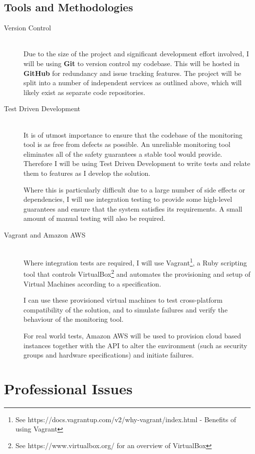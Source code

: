 \documentclass{cshonours}
\begin{document}
\section{Tools and Methodologies}
\begin{description}
  \item [Version Control]\hfill \\
    Due to the size of the project and significant development effort involved, I will be using \textbf{Git} to version control my codebase. This will be hosted in \textbf{GitHub} for redundancy and issue tracking features. The project will be split into a number of independent services as outlined above, which will likely exist as separate code repositories.
  \item [Test Driven Development]\hfill \\
    It is of utmost importance to ensure that the codebase of the monitoring tool is as free from defects as possible. An unreliable monitoring tool eliminates all of the safety guarantees a stable tool would provide. Therefore I will be using Test Driven Development to write tests and relate them to features as I develop the solution.

    Where this is particularly difficult due to a large number of side effects or dependencies, I will use integration testing to provide some high-level guarantees and ensure that the system satisfies its requirements. A small amount of manual testing will also be required.
  \item [Vagrant and Amazon AWS]\hfill \\
    Where integration tests are required, I will use Vagrant\footnote{See
    https://docs.vagrantup.com/v2/why-vagrant/index.html - Benefits of using Vagrant}, a Ruby scripting tool that controls
    VirtualBox\footnote{See https://www.virtualbox.org/ for an overview of VirtualBox} and automates the provisioning and setup of Virtual Machines according to a specification.

    I can use these provisioned virtual machines to test cross-platform compatibility of the solution, and to simulate failures and verify the behaviour of the monitoring tool.

    For real world tests, Amazon AWS will be used to provision cloud based instances together with the API to alter the environment (such as security groups and hardware specifications) and initiate failures.
\end{description}

\pagebreak
\chapter{Professional Issues}
\end{document}
